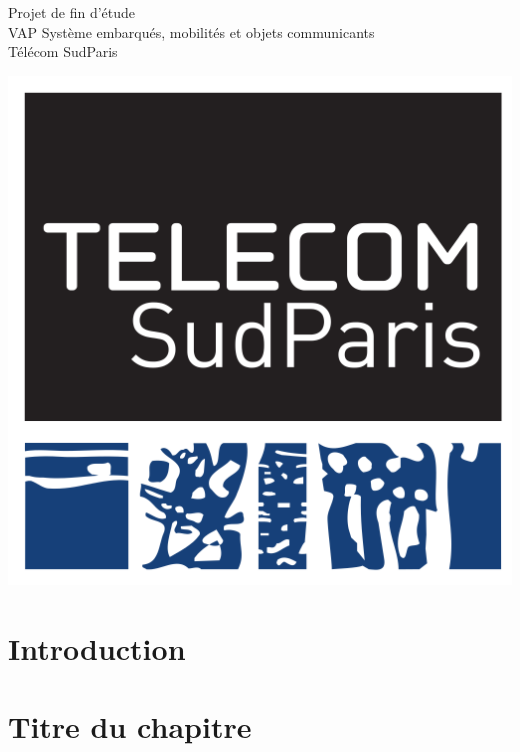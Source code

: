 \documentclass{report}
\begin{document}
\begin{titlepage}
  \begin{minipage}{0.7\linewidth}
    \noindent Projet de fin d'étude
    \\VAP Système embarqués, mobilités et objets communicants
    \\ Télécom SudParis
  \end{minipage}\hfill
  \begin{minipage}{0.25\linewidth}
    \begin{flushright}
      \includegraphics[height=0.07\textheight]{tsp.png}
    \end{flushright}
  \end{minipage}



\end{titlepage}


\thispagestyle{empty}
\newpage
\newpage
\tableofcontents
\thispagestyle{empty}
\newpage
\newpage
\setcounter{page}{1}





\chapter*{Introduction}

\chapter{Titre du chapitre}
\end{document}
